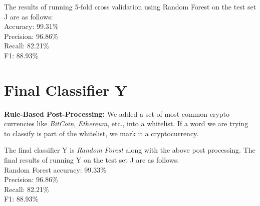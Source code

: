 \documentclass[12pt,letterpaper]{article}
\begin{document}
The results of running 5-fold cross validation using Random Forest on the test set J are as follows:\\
Accuracy: 99.31\%\\
Precision: 96.86\%\\
Recall: 82.21\%\\
F1: 88.93\%\\


\section*{Final Classifier Y}
\textbf{Rule-Based Post-Processing:} We added a set of most common crypto currencies like \textit{BitCoin}, \textit{Ethereum}, etc., into a whitelist. If a word we are trying to classify is part of the whitelist, we mark it a cryptocurrency. 

The final classifier Y  is \textit{Random Forest} along with the above post processing. The final results of running Y on the test set J are as follows:\\
Random Forest accuracy: 99.33\%\\
Precision: 96.86\%\\
Recall: 82.21\%\\
F1: 88.93\%\\


{\small
%
%
}
\end{document}
